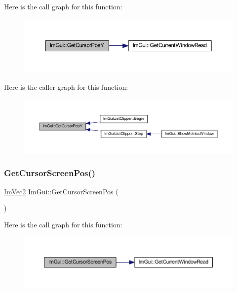 Here is the call graph for this function\+:
\nopagebreak
\begin{figure}[H]
\begin{center}
\leavevmode
\includegraphics[width=350pt]{namespace_im_gui_a86e409551f256b542166989c558d41c1_cgraph}
\end{center}
\end{figure}
Here is the caller graph for this function\+:
\nopagebreak
\begin{figure}[H]
\begin{center}
\leavevmode
\includegraphics[width=350pt]{namespace_im_gui_a86e409551f256b542166989c558d41c1_icgraph}
\end{center}
\end{figure}
\mbox{\label{namespace_im_gui_adb0db3c1ee36f5085f35890a4229ae75}} 
\subsubsection{\texorpdfstring{Get\+Cursor\+Screen\+Pos()}{GetCursorScreenPos()}}
{\footnotesize\ttfamily \mbox{\hyperlink{struct_im_vec2}{Im\+Vec2}} Im\+Gui\+::\+Get\+Cursor\+Screen\+Pos (\begin{DoxyParamCaption}{ }\end{DoxyParamCaption})}

Here is the call graph for this function\+:
\nopagebreak
\begin{figure}[H]
\begin{center}
\leavevmode
\includegraphics[width=350pt]{namespace_im_gui_adb0db3c1ee36f5085f35890a4229ae75_cgraph}
\end{center}
\end{figure}
\mbox{\label{namespace_im_gui_a8ee9647de3b39fc7b77395082fc9e0cc}} 
